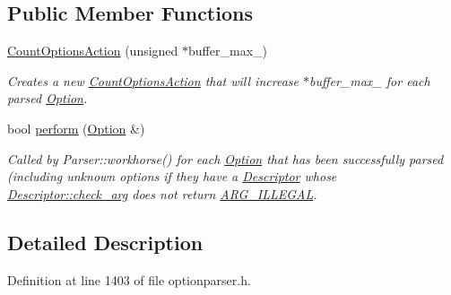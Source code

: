 \subsection*{Public Member Functions}
\begin{DoxyCompactItemize}
\item 
\hyperlink{class_option_parser_1_1_stats_1_1_count_options_action_a1c535a57ab397fb52435373cb8ef143e}{Count\-Options\-Action} (unsigned $\ast$buffer\-\_\-max\-\_\-)
\begin{DoxyCompactList}\small\item\em Creates a new \hyperlink{class_option_parser_1_1_stats_1_1_count_options_action}{Count\-Options\-Action} that will increase {\ttfamily $\ast$buffer\-\_\-max\-\_\-} for each parsed \hyperlink{class_option_parser_1_1_option}{Option}. \end{DoxyCompactList}\item 
bool \hyperlink{class_option_parser_1_1_stats_1_1_count_options_action_a1428a8145dfcf0f57a33ccef99737709}{perform} (\hyperlink{class_option_parser_1_1_option}{Option} \&)
\begin{DoxyCompactList}\small\item\em Called by Parser\-::workhorse() for each \hyperlink{class_option_parser_1_1_option}{Option} that has been successfully parsed (including unknown options if they have a \hyperlink{struct_option_parser_1_1_descriptor}{Descriptor} whose \hyperlink{struct_option_parser_1_1_descriptor_aac19c7bd3a84282211edd0331c92a44a}{Descriptor\-::check\-\_\-arg} does not return \hyperlink{namespace_option_parser_ad237d47d58c66dea8dcf4f53ac11a6e4a6ea016ff6334ed0d2ec885e96a76c472}{A\-R\-G\-\_\-\-I\-L\-L\-E\-G\-A\-L}. \end{DoxyCompactList}\end{DoxyCompactItemize}


\subsection{Detailed Description}


Definition at line 1403 of file optionparser.\-h.



